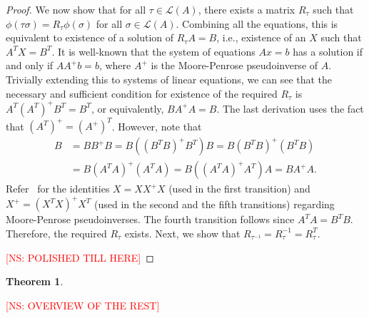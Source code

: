 \documentclass[10pt,letterpaper]{article}
\newcommand{\calL}{{\mathcal{L}}}
\newcommand{\rank}{{\calL(A)}}
\newtheorem{theorem}{Theorem}
\newcommand{\kibitz}[2]{\ifnum\Comments=1\textcolor{#1}{#2}\fi}
\newcommand{\cns}[1]{\kibitz{red} {[NS: #1]}}
\begin{document}
\begin{proof}
We now show that for all $\tau \in \rank$, there exists a matrix $R_{\tau}$ such that $\phi(\tau \sigma) = R_{\tau} \phi(\sigma)$ for all $\sigma \in \rank$. Combining all the equations, this is equivalent to existence of a solution of $R_{\tau} A = B$, i.e., existence of an $X$ such that $A^T X = B^T$. It is well-known that the system of equations $Ax=b$ has a solution if and only if $AA^{+}b = b$, where $A^{+}$ is the Moore-Penrose pseudoinverse of $A$. Trivially extending this to systems of linear equations, we can see that the necessary and sufficient condition for existence of the required $R_{\tau}$ is $A^T (A^T)^{+} B^T = B^T$, or equivalently, $B A^{+} A = B$. The last derivation uses the fact that $(A^T)^{+} = (A^{+})^T$. However, note that
\begin{align*}
B &= B B^{+} B = B \left( (B^T B)^{+} B^T \right) B = B (B^T B)^{+} \left( B^T B \right) \\
&= B (A^T A)^{+} \left( A^T A \right) = B \left( (A^T A)^{+} A^T \right) A = B A^{+} A.
\end{align*}
Refer~\cite{BH12} for the identities $X = X X^{+} X$ (used in the first transition) and $X^{+} = (X^T X)^{+} X^T$ (used in the second and the fifth transitions) regarding Moore-Penrose pseudoinverses. The fourth transition follows since $A^T A = B^T B$. Therefore, the required $R_{\tau}$ exists. Next, we show that $R_{\tau^{-1}} = R_{\tau}^{-1} = R_{\tau}^T$. 

\cns{POLISHED TILL HERE}

\end{proof}

\begin{theorem}
\end{theorem}

\cns{OVERVIEW OF THE REST}
\end{document}
